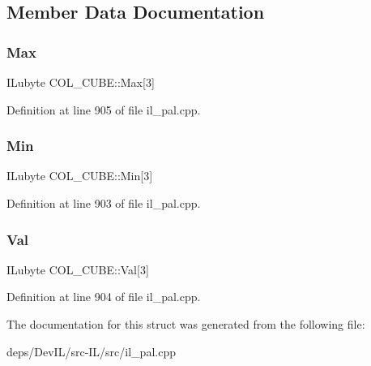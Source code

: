 \subsection{Member Data Documentation}
\mbox{\label{structCOL__CUBE_aab205483de4cb6aee8b7e7dc460867ec}} 
\subsubsection{\texorpdfstring{Max}{Max}}
{\footnotesize\ttfamily I\+Lubyte C\+O\+L\+\_\+\+C\+U\+B\+E\+::\+Max\mbox{[}3\mbox{]}}



Definition at line 905 of file il\+\_\+pal.\+cpp.

\mbox{\label{structCOL__CUBE_ac986e073e55985163badf6f4721c3a1e}} 
\subsubsection{\texorpdfstring{Min}{Min}}
{\footnotesize\ttfamily I\+Lubyte C\+O\+L\+\_\+\+C\+U\+B\+E\+::\+Min\mbox{[}3\mbox{]}}



Definition at line 903 of file il\+\_\+pal.\+cpp.

\mbox{\label{structCOL__CUBE_a0f51973b57a6eb28fe805f24c10b1b98}} 
\subsubsection{\texorpdfstring{Val}{Val}}
{\footnotesize\ttfamily I\+Lubyte C\+O\+L\+\_\+\+C\+U\+B\+E\+::\+Val\mbox{[}3\mbox{]}}



Definition at line 904 of file il\+\_\+pal.\+cpp.



The documentation for this struct was generated from the following file\+:\begin{DoxyCompactItemize}
\item 
deps/\+Dev\+I\+L/src-\/\+I\+L/src/il\+\_\+pal.\+cpp\end{DoxyCompactItemize}
